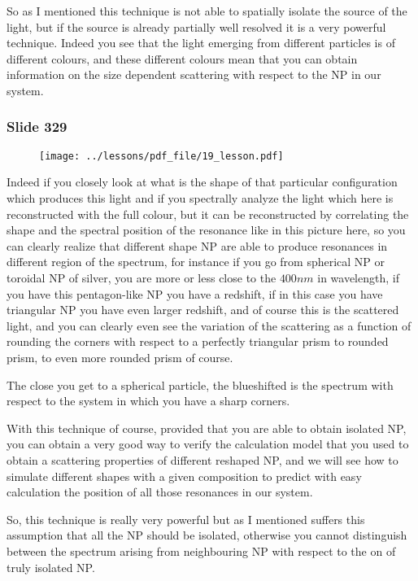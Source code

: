 \documentclass[../main/main.tex]{subfiles}
\begin{document}
So as I mentioned this technique is not able to spatially isolate the source of the light, but  if the source is already partially well resolved it is a very powerful technique. Indeed you see that the light emerging from different particles is of different colours, and these different colours mean that you can obtain information on the size dependent scattering with respect to the NP in our system. 

\newpage

\subsubsection{Slide 329}

\begin{figure}[h!]
\centering
\texttt{[image: ../lessons/pdf\_file/19\_lesson.pdf]}
\end{figure}

Indeed if you closely look at what is the shape of that particular configuration which produces this light and if you spectrally analyze the light which here is reconstructed with the full colour, but it can be reconstructed by correlating the shape and the spectral position of the resonance like in this picture here, so you can clearly realize that different shape NP are able to produce resonances in different region of the spectrum, for instance if you go from spherical NP or toroidal NP of silver, you are more or less close to the $400 nm$ in wavelength, if you have this pentagon-like NP you have a redshift, if in this case you have triangular NP you have even larger redshift, and of course this is the scattered light, and you can clearly even see the variation of the scattering as a function of rounding the corners with respect to a perfectly triangular prism to rounded prism, to even more rounded prism of course. 

The close you get to a spherical particle, the blueshifted is the spectrum with respect to the system in which you have a sharp corners.

With this technique of course, provided that you are able to obtain isolated NP, you can obtain a very good way to verify the calculation model that you used to obtain a scattering properties of different reshaped NP, and we will see how to simulate different shapes with a given composition to predict with easy calculation the position of all those resonances in our system.

So, this technique is really very powerful but as I mentioned suffers this assumption that all the NP should be isolated, otherwise you cannot distinguish between the spectrum arising from neighbouring NP with respect to the on of truly isolated NP.





\clearpage
\end{document}
